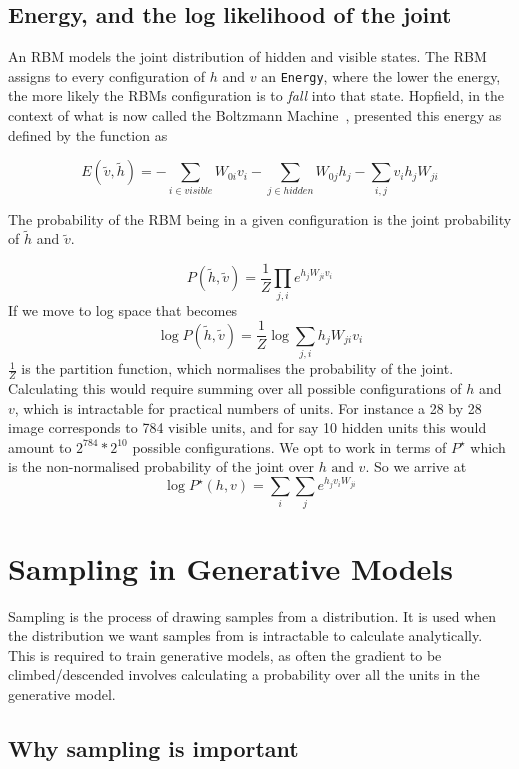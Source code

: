 \subsection{Energy, and the log likelihood of the joint}

An RBM models the joint distribution of hidden and visible states.
The RBM assigns to every configuration of $h$ and $v$ an \texttt{Energy}, where the lower the energy, the more likely the RBMs configuration is to \textit{fall} into that state. Hopfield, in the context of what is now called the Boltzmann Machine~\cite{Hopfield01041982}, presented this energy as defined by the function as

$$ E(\tilde{v},\tilde{h}) = -\sum_{i \in visible}{W_{0i}v_i}   -\sum_{j \in hidden}{W_{0j}h_j}  -\sum_{i,j}{v_ih_jW_{ji}}  $$

The probability of the RBM being in a given configuration is the joint probability of $\tilde{h}$ and $\tilde{v}$.


$$ P(\tilde{h},\tilde{v}) = \frac{1}{Z} \prod_{j,i} e^{h_jW_{ji}v_i} $$
If we move to log space that becomes
$$ \log P(\tilde{h},\tilde{v}) = \frac{1}{Z} \log \sum_{j,i} h_j W_{ji} v_i $$
$\frac{1}{Z} $ is the partition function, which normalises the probability of the joint. Calculating this would require summing over all possible configurations of $h$ and $v$, which is intractable for practical numbers of units. For instance a 28 by 28 image corresponds to 784 visible units, and for say 10 hidden units this would amount to $2^{784} * 2^{10} $ possible configurations. We opt to work in terms of $P^\star$ which is the non-normalised probability of the joint over $h \text{ and } v$.
So we arrive at
\begin{equation}\label{eq:LogPJoint}
   \log P^\star(h, v) = \sum_i \sum_j e^{h_j v_i W_{ji}}
\end{equation}


\section{Sampling in Generative Models}
Sampling is the process of drawing samples from a distribution. It is used when the distribution we want samples from is intractable to calculate analytically. This is required to train generative models, as often the gradient to be climbed/descended involves calculating a probability over all the units in the generative model.
\subsection{Why sampling is important}

